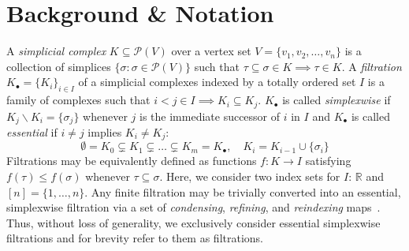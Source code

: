 \documentclass[10pt]{article}
\newcommand{\+}{%
	\raisebox{0.18ex}{\scaleobj{0.55}{+}}
}
\begin{document}
\section{Background \& Notation}\label{sec:background_notation}
A \emph{simplicial complex} $K \subseteq \mathcal{P}(V)$ over a vertex set $V = \{v_1, v_2, \dots, v_n \}$ is a collection of simplices $\{\sigma : \sigma \in \mathcal{P}(V) \}$ such that $\tau \subseteq \sigma \in K \implies \tau \in K$.
A \emph{filtration} $K_\bullet = \{K_i\}_{i\in I}$ of a simplicial complexes indexed by a totally ordered set $I$ is a family of complexes such that $i< j \in I \implies K_i \subseteq K_j$. $K_\bullet$ is called \emph{simplexwise} if $K_j \smallsetminus K_i = \{\sigma_j\}$ whenever $j$ is the immediate successor of $i$ in $I$ and $K_\bullet$ is called \emph{essential} if $i \neq j$ implies $K_i \neq K_j$:
\begin{equation}
	\emptyset = K_0 \subsetneq K_1 \subsetneq \dots \subsetneq K_m  = K_\bullet, \quad K_i  = K_{i-1} \cup \{\sigma_i\}
\end{equation} 
Filtrations may be equivalently defined as functions $f : K \to I$ satisfying $f(\tau) \leq f(\sigma)$ whenever $\tau \subseteq \sigma$. Here, we consider two index sets for $I$: $\mathbb{R}$ and $[n] = \{ 1, \dots, n\}$. 
Any finite filtration may be trivially converted into an essential, simplexwise filtration via a set of \emph{condensing}, \emph{refining}, and \emph{reindexing} maps~\cite{bauer2021ripser}. Thus, without loss of generality, we exclusively consider essential simplexwise filtrations and for brevity refer to them as filtrations.
\end{document}
